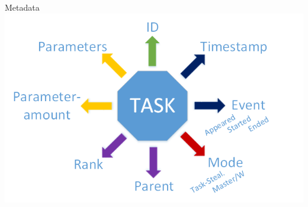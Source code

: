 	\begin{frame}{Metadata}
	\includegraphics[width=1.0\textwidth]{images/Task/metadata1.png}
	\end{frame}
	
